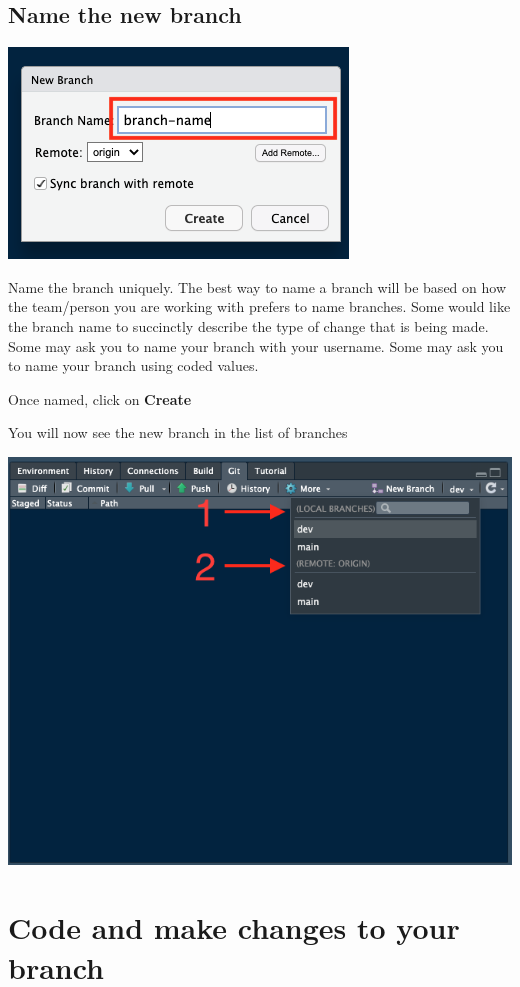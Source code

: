 \documentclass[
  12pt,
]{book}
\begin{document}
\hypertarget{name-the-new-branch}{%
\subsection{Name the new branch}\label{name-the-new-branch}}

\includegraphics{images/git_branch2.png}

Name the branch uniquely. The best way to name a branch will be based on how the team/person you are working with prefers to name branches. Some would like the branch name to succinctly describe the type of change that is being made. Some may ask you to name your branch with your username. Some may ask you to name your branch using coded values.

Once named, click on \textbf{Create}

You will now see the new branch in the list of branches

\includegraphics{images/git_branch3.png}

\hypertarget{code-and-make-changes-to-your-branch}{%
\section{Code and make changes to your branch}\label{code-and-make-changes-to-your-branch}}
\end{document}
